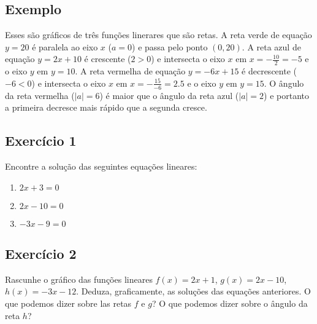 \subsection*{Exemplo}

Esses são gráficos de três funções linerares que são retas. A reta verde de
equação $y = 20$ é paralela ao eixo $x$ ($a = 0$) e passa pelo ponto $(0,20)$. A
reta azul de equação $y = 2 x + 10$ é crescente ($2 > 0$) e intersecta o eixo
$x$ em $x = -\frac{10}{2} = -5$ e o eixo $y$ em $y = 10$. A reta vermelha de
equação $y = -6x + 15$ é decrescente ($-6 < 0$) e intersecta o eixo $x$ em $x =
-\frac{15}{-6} = 2.5$ e o eixo $y$ em $y = 15$. O ângulo da reta vermelha ($|a|
= 6$) é maior que o ângulo da reta azul ($|a| = 2$) e portanto a primeira
decresce mais rápido que a segunda cresce.

\begin{center}
\end{center}

\subsection*{Exercício 1}

Encontre a solução das seguintes equações lineares:

\begin{enumerate}
\item $2x+3 = 0$
\item $2x-10 = 0$
\item $-3x-9 = 0$
\end{enumerate}

\subsection*{Exercício 2}

Rascunhe o gráfico das funções lineares
$f(x) = 2x+1$, $g(x) = 2x-10$, $h(x)=-3x-12$. Deduza, graficamente, as soluções
das equações anteriores. O que podemos dizer sobre las retas $f$ e $g$? O que
podemos dizer sobre o ângulo da reta $h$?

